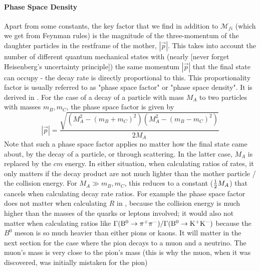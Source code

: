 \paragraph{Phase Space Density}
Apart from some constants, the key factor that we find in addition to $\mathcal{M}_{fi}$ (which we get from Feynman rules) is the magnitude of the three-momentum of the daughter particles in the restframe of the mother, $|\vec{p}|$. This takes into account the number of different quantum mechanical states with (nearly [never forget Heisenberg's uncertainty principle]) the same momentum $|\vec{p}|$ that the final state can occupy - the decay rate is directly proportional to this. This proportionality factor is usually referred to as "phase space factor" or "phase space density". It is derived in . 
For the case of a decay of a particle with mass $M_A$ to two particles with masses $m_B, m_C$, the phase space factor is given by
\begin{equation}
\label{eq:phsp_dens}
 |\vec{p}| = \frac{\sqrt{(M_A^2 - (m_B + m_C)^2)(M_A^2 - (m_B - m_C)^2)}}{2M_A}
\end{equation}
Note that such a phase space factor applies no matter how the final state came about, by the decay of a particle, or through scattering. 
In the latter case, $M_A$ is replaced by the $cm$ energy. In either situation, when calculating ratios of rates, it only matters if the decay product are not much lighter than the mother particle / the collision energy. For $M_A \gg m_B, m_C$, this reduces to a constant ($\frac{1}{2} M_A$) that cancels when calculating decay rate ratios. For example the phase space factor does not matter when calculating $R$ in , because the collision energy is much higher than the masses of the quarks or leptons involved; it would also not matter when calculating ratios like $\Gamma({\rm B^0 \to \pi^+ \pi^-})/\Gamma({\rm B^0 \to K^+ K^-})$ because the $B^0$ meson is so much heavier than either pions or kaons. 
It will matter in the next section for the case where the pion decays to a muon and a neutrino. The muon's mass is very close to the pion's mass (this is why the muon, when it was discovered, was initially mistaken for the pion)\\



